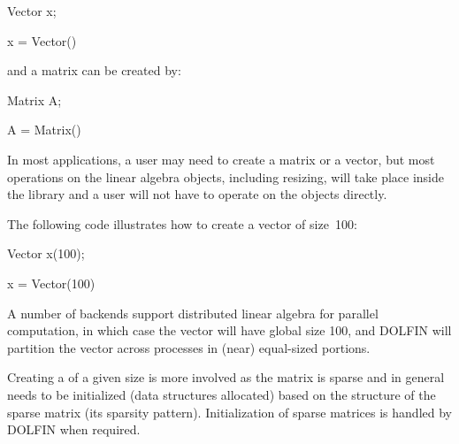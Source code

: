 \begin{c++}
Vector x;
\end{c++}

\begin{python}
x = Vector()
\end{python}
and a matrix can be created by:

\begin{c++}
Matrix A;
\end{c++}

\begin{python}
A = Matrix()
\end{python}
In most applications, a user may need to create a matrix or a vector,
but most operations on the linear algebra objects, including resizing,
will take place inside the library and a user will not have to operate
on the objects directly.

The following code illustrates how to create a vector of size~100:
\begin{c++}
Vector x(100);
\end{c++}
\begin{python}
x = Vector(100)
\end{python}
A number of backends support distributed linear algebra for parallel
computation, in which case the vector  will have global size
100, and DOLFIN will partition the vector across processes in (near)
equal-sized portions.

%
%

Creating a  of a given size is more involved as the matrix
is sparse and in general needs to be initialized (data structures
allocated) based on the structure of the sparse matrix (its sparsity
pattern). Initialization of sparse matrices is handled by DOLFIN when
required.

